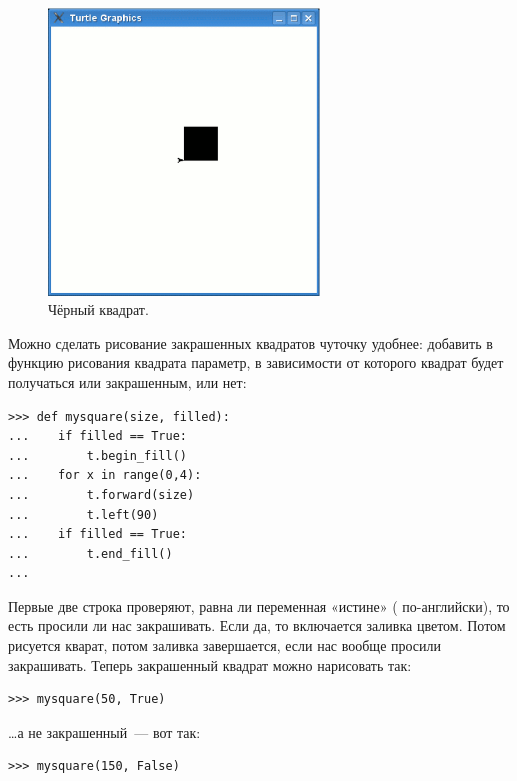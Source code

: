 \begin{figure}
\begin{center}
\includegraphics[width=72mm]{../en/figure27.eps}
\end{center}
\caption{Чёрный квадрат.}\label{fig27}
\end{figure}

Можно сделать рисование закрашенных квадратов чуточку удобнее: добавить в функцию рисования квадрата параметр, в зависимости от которого квадрат будет получаться или закрашенным, или нет:

\begin{listing}
\begin{verbatim}
>>> def mysquare(size, filled):
...    if filled == True:
...        t.begin_fill()
...    for x in range(0,4):
...        t.forward(size)
...        t.left(90)
...    if filled == True:
...        t.end_fill()
...
\end{verbatim}
\end{listing}

Первые две строка проверяют, равна ли переменная  «истине» ( по-английски), то есть просили ли нас закрашивать. Если да, то включается заливка цветом. Потом рисуется кварат, потом заливка завершается, если нас вообще просили закрашивать. Теперь закрашенный квадрат можно нарисовать так:
\begin{listing}
\begin{verbatim}
>>> mysquare(50, True)
\end{verbatim}
\end{listing}

…а не закрашенный — вот так:

\begin{listing}
\begin{verbatim}
>>> mysquare(150, False)
\end{verbatim}
\end{listing}


